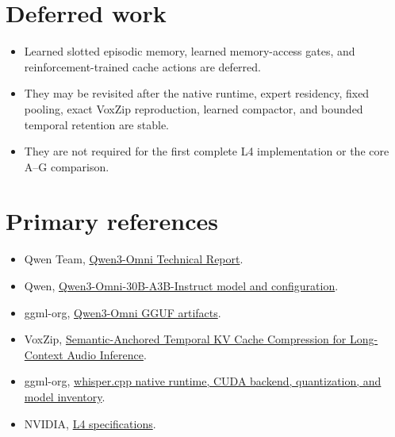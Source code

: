 \documentclass[10pt,letterpaper]{article}
\begin{document}
\section{Deferred work}
\begin{itemize}
    \item Learned slotted episodic memory, learned memory-access gates, and reinforcement-trained cache actions are deferred.
    \item They may be revisited after the native runtime, expert residency, fixed pooling, exact VoxZip reproduction, learned compactor, and bounded temporal retention are stable.
    \item They are not required for the first complete L4 implementation or the core A--G comparison.
\end{itemize}

\section*{Primary references}
\small
\begin{itemize}
    \item Qwen Team, \href{https://arxiv.org/abs/2509.17765}{Qwen3-Omni Technical Report}.
    \item Qwen, \href{https://huggingface.co/Qwen/Qwen3-Omni-30B-A3B-Instruct}{Qwen3-Omni-30B-A3B-Instruct model and configuration}.
    \item ggml-org, \href{https://huggingface.co/ggml-org/Qwen3-Omni-30B-A3B-Instruct-GGUF}{Qwen3-Omni GGUF artifacts}.
    \item VoxZip, \href{https://arxiv.org/abs/2608.08569}{Semantic-Anchored Temporal KV Cache Compression for Long-Context Audio Inference}.
    \item ggml-org, \href{https://github.com/ggml-org/whisper.cpp}{whisper.cpp native runtime, CUDA backend, quantization, and model inventory}.
    \item NVIDIA, \href{https://www.nvidia.com/en-us/data-center/l4/}{L4 specifications}.
\end{itemize}
\end{document}
